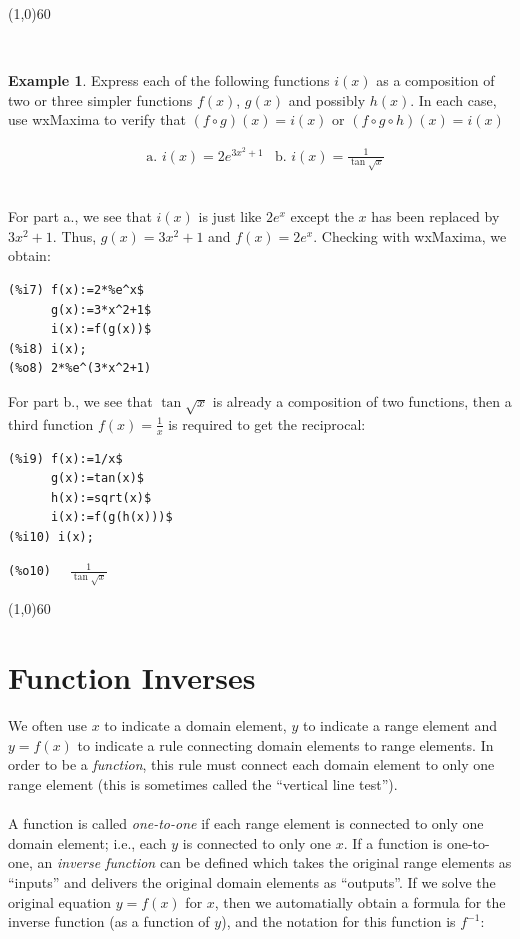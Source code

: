 \documentclass[10.5pt,twoside]{report}
\theoremstyle{definition}
\newtheorem{exmp}{Example}[section]
\begin{document}
\line(1,0){60}
\linethickness{0.5mm}

${}$\\
 

\begin{exmp}

Express each of the following functions $i(x)$ as a composition of two or three simpler functions $f(x)$, $g(x)$ and possibly $h(x)$.  In each case, use wxMaxima to verify that $(f \circ g)(x)=i(x)$ or $(f \circ g \circ h)(x)=i(x)$

\begin{align*}  
&\text{a.  } i(x)=2e^{3x^2+1}  &\text{b.  } i(x)=\frac{1}{\tan{\sqrt{x}}}
\end{align*}

${}$\\

For part a., we see that $i(x)$ is just like $2e^x$ except the $x$ has been replaced by $3x^2+1$.  Thus, $g(x)=3x^2+1$ and $f(x)=2e^x$.  Checking with wxMaxima, we obtain:\\

\begin{verbatim}
(%i7) f(x):=2*%e^x$
      g(x):=3*x^2+1$
      i(x):=f(g(x))$
(%i8) i(x);
(%o8) 2*%e^(3*x^2+1)
\end{verbatim}

For part b., we see that $\tan{\sqrt{x}}$ is already a composition of two functions, then a third function $f(x)=\frac{1}{x}$ is required to get the reciprocal:\\

\begin{verbatim}
(%i9) f(x):=1/x$
      g(x):=tan(x)$
      h(x):=sqrt(x)$
      i(x):=f(g(h(x)))$
(%i10) i(x);
\end{verbatim}
\verb|(%o10)  | $\frac{1}{\tan{\sqrt{x}}}$

\end{exmp}

\line(1,0){60}
\linethickness{0.5mm}

\pagebreak

\section{Function Inverses}\label{Function Inverses}

We often use $x$ to indicate a domain element, $y$ to indicate a range element and $y=f(x)$ to indicate a rule connecting domain elements to range elements.  In order to be a \textit{function}, this rule must connect each domain element to only one range element (this is sometimes called the ``vertical line test'').\\
${}$\\
A function is called \textit{one-to-one} if each range element is connected to only one domain element; i.e., each $y$ is connected to only one $x$.   If a function is one-to-one, an \textit{inverse function} can be defined which takes the original range elements as ``inputs'' and delivers the original domain elements as ``outputs''.  If we solve the original equation $y=f(x)$ for $x$, then we automatially obtain a formula for the inverse function (as a function of $y$), and the notation for this function is $f^{-1}$:
\end{document}
